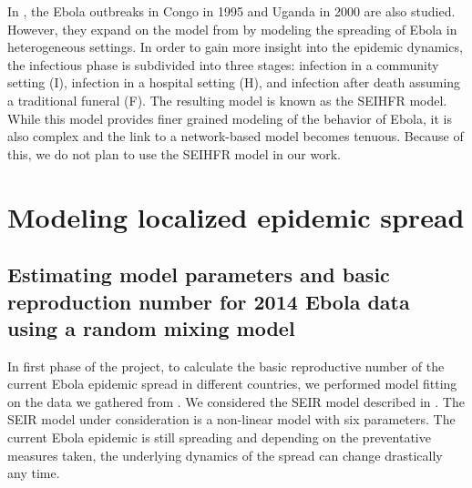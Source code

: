 \documentclass[10pt, journal,onecolumn]{IEEEtran}
\begin{document}
\label{SubSec:SEIHFR}

In \citep{legrand2007understanding}, the Ebola outbreaks in Congo in 1995 and Uganda in 2000
are also studied. However, they expand on the model from
\citep{chowell2004basic} by modeling the spreading of Ebola
in heterogeneous settings. In order to gain more insight into the epidemic dynamics,
the infectious phase is subdivided into three stages:
infection in a community setting (I), infection in a hospital setting (H), and
infection after death assuming a traditional funeral (F). The resulting model is known
as the SEIHFR model. While this model provides finer grained modeling of the behavior of Ebola,
it is also complex and the link to a network-based model becomes tenuous.
Because of this, we do not plan to use the SEIHFR model in our work.

\bigskip





\section{Modeling localized epidemic spread}
\label{sec:IntraCountry}





\subsection*{\textbf{Estimating model parameters and basic reproduction number for 2014 Ebola data using a random mixing model}}

In first phase of the project, to calculate the basic reproductive number of the current Ebola
epidemic spread in different countries, we performed model fitting on the data we gathered from
\cite{cmriversdata}. We considered the SEIR model described in \cite{chowell2004basic}. The SEIR
model under consideration is a non-linear model with six parameters. The current Ebola epidemic is
still spreading and depending on the preventative measures  taken, the underlying dynamics of the
spread can change drastically any time.
\end{document}
